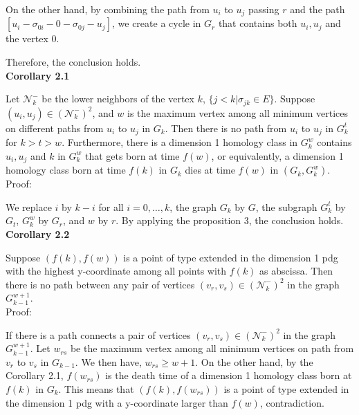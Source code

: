 \documentclass[a4paper,12pt]{article}
\numberwithin{equation}{section}
\begin{document}
	On the other hand, by combining the path from $u_i$ to $u_j$ passing $r$ and the path $[u_i - \sigma_{0i} - 0 - \sigma_{0j} - u_j]$, we create a cycle in $G_r$ that contains both $u_i, u_j$ and the vertex $0$. 
	
	Therefore, the conclusion holds.\\
	
	\noindent \textbf{Corollary 2.1}

	Let $\mathcal{N}_k^-$ be the lower neighbors of the vertex $k$, $\{j<k \vert \sigma_{jk} \in E \}$. Suppose $(u_i,u_j) \in (\mathcal{N}_k^-)^2$, and $w$ is the maximum vertex among all minimum vertices on different paths from $u_i$ to $u_j$ in $G_k$. Then there is no path from $u_i$ to $u_j$ in $G^t_k$ for $k>t>w$. Furthermore, there is a dimension 1 homology class in $G^w_k$ contains $u_i, u_j$ and $k$ in $G^w_k$ that gets born at time $f(w)$, or equivalently, a dimension 1 homology class born at time $f(k)$ in $G_k$ dies at time $f(w)$ in $(G_k,G^w_k)$.\\
	
	\noindent Proof: 
	
	We replace $i$ by $k-i$ for all $i=0,\ldots,k$, the graph $G_k$ by $G$, the subgraph $G^t_k$ by $G_t$, $G^w_k$ by $G_r$, and $w$ by $r$. By applying the proposition 3, the conclusion holds.\\
	
	\noindent \textbf{Corollary 2.2}
	
	Suppose $(f(k),f(w))$ is a point of type extended in the dimension 1 pdg with the highest y-coordinate among all points with $f(k)$ as abscissa. Then there is no path between any pair of vertices $(v_r,v_s) \in (\mathcal{N}^-_k)^2$ in the graph $G_{k-1}^{w+1}$.\\
	
	\noindent Proof:
	
	If there is a path connects a pair of vertices $(v_r,v_s) \in (\mathcal{N}^-_k)^2$ in the graph $G_{k-1}^{w+1}$. Let $w_{rs}$ be the maximum vertex among all minimum vertices on path from $v_r$ to $v_s$ in $G_{k-1}$. We then have, $w_{rs} \geq w+1$. On the other hand, by the Corollary 2.1, $f(w_{rs})$ is the death time of a dimension 1 homology class born at $f(k)$ in $G_k$. This means that $(f(k),f(w_{rs}))$ is a point of type extended in the dimension 1 pdg with a y-coordinate larger than $f(w)$, contradiction.\\
		
\end{document}
